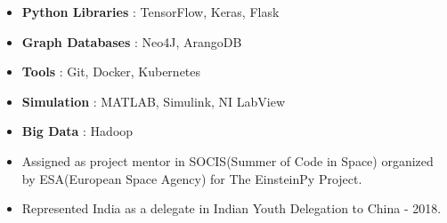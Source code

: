 \documentclass[10pt,a4paper,ragged2e]{altacv}
\begin{document}




\begin{itemize}
\item \textbf{Python Libraries} : TensorFlow, Keras, Flask
\item \textbf{Graph Databases} : Neo4J, ArangoDB
\item \textbf{Tools} : Git, Docker, Kubernetes
\item \textbf{Simulation} : MATLAB, Simulink, NI LabView
\item \textbf{Big Data} : Hadoop
\end{itemize}






\begin{itemize}
\item Assigned as project mentor in SOCIS(Summer of Code in Space) organized by ESA(European Space Agency) for The EinsteinPy Project.
\end{itemize}

\divider

\begin{itemize}
\item Represented India as a delegate in Indian Youth Delegation to China - 2018.
\end{itemize}




\end{document}
